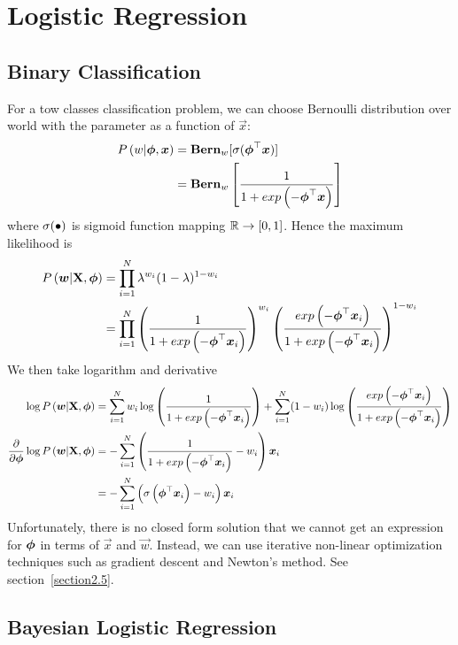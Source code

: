 
\chapter{Logistic Regression}
\label{chapter7}



\section{Binary Classification}
\label{section7.1}

For a tow classes classification problem, we can choose Bernoulli distribution over world with the parameter as a function of $\vec{x}$:
\begin{align*}
	P\left(w|\boldsymbol{\phi},\boldsymbol{x}\right)&=\mathbf{Bern}_w[\sigma(\boldsymbol{\phi}^\top\boldsymbol{x})] \\
	&=\mathbf{Bern}_w\left[\frac{1}{1+exp\left(-\boldsymbol{\phi}^\top\boldsymbol{x}\right)}\right]
\end{align*}
where $\sigma(\bullet)$ is sigmoid function mapping $\mathbb{R}\to[0,1]$. Hence the maximum likelihood is
\begin{align*}
	P\left(\boldsymbol{w}|\mathbf{X},\boldsymbol{\phi}\right)&=\prod_{i=1}^N\lambda^{w_i}(1-\lambda)^{1-w_i} \\
	&=\prod_{i=1}^N\left(\frac{1}{1+exp\left(-\boldsymbol{\phi}^\top\boldsymbol{x}_i\right)}\right)^{w_i}\left(\frac{exp\left(-\boldsymbol{\phi}^\top\boldsymbol{x}_i\right)}{1+exp\left(-\boldsymbol{\phi}^\top\boldsymbol{x}_i\right)}\right)^{1-w_i}
\end{align*}
We then take logarithm and derivative
\begin{align*}
	\log P\left(\boldsymbol{w}|\mathbf{X},\boldsymbol{\phi}\right)&=\sum_{i=1}^Nw_i\log\left(\frac{1}{1+exp\left(-\boldsymbol{\phi}^\top\boldsymbol{x}_i\right)}\right)+\sum_{i=1}^N(1-w_i)\log\left(\frac{exp\left(-\boldsymbol{\phi}^\top\boldsymbol{x}_i\right)}{1+exp\left(-\boldsymbol{\phi}^\top\boldsymbol{x}_i\right)}\right) \\
	\frac{\partial}{\partial\boldsymbol{\phi}}\log P\left(\boldsymbol{w}|\mathbf{X},\boldsymbol{\phi}\right)&=-\sum_{i=1}^N\left(\frac{1}{1+exp\left(-\boldsymbol{\phi}^\top\boldsymbol{x}_i\right)}-w_i\right)\boldsymbol{x}_i \\
	&=-\sum_{i=1}^N\left(\sigma\left(\boldsymbol{\phi}^\top\boldsymbol{x}_i\right)-w_i\right)\boldsymbol{x}_i
\end{align*}
Unfortunately, there is no closed form solution that we cannot get an expression for $\boldsymbol{\phi}$ in terms of $\vec{x}$ and $\vec{w}$. Instead, we can use iterative non-linear optimization techniques such as gradient descent and Newton's method. See section~\ref{section2.5}.



\section{Bayesian Logistic Regression}
\label{section7.2}


